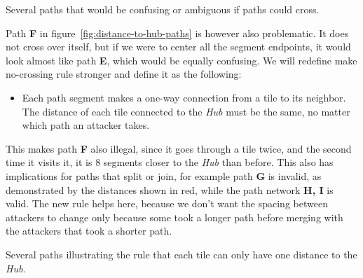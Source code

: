 \begin{center}
    \captionsetup{type=figure}
    \caption{Several paths that would be confusing or ambiguous if paths could cross.}
    \label{fig:ambiguous-paths}
\end{center}

Path \textbf{F} in figure~\ref{fig:distance-to-hub-paths} is however also problematic.
It does not cross over itself, but if we were to center all the segment endpoints, it would look almost like path \textbf{E}, which would be equally confusing.
We will redefine make no-crossing rule stronger and define it as the following:
\begin{itemize}
    \item Each path segment makes a one-way connection from a tile to its neighbor.
          The distance of each tile connected to the \emph{Hub} must be the same, no matter which path an attacker takes.
\end{itemize}
This makes path \textbf{F} also illegal, since it goes through a tile twice, and the second time it visits it, it is 8 segments closer to the \emph{Hub} than before.
This also has implications for paths that split or join, for example path \textbf{G} is invalid, as demonstrated by the distances shown in red, while the path network \textbf{H, I} is valid.
The new rule helps here, because we don't want the spacing between attackers to change only because some took a longer path before merging with the attackers that took a shorter path.

\begin{center}
    \captionsetup{type=figure}
    \caption{Several paths illustrating the rule that each tile can only have one distance to the \emph{Hub}.}
    \label{fig:distance-to-hub-paths}
\end{center}


